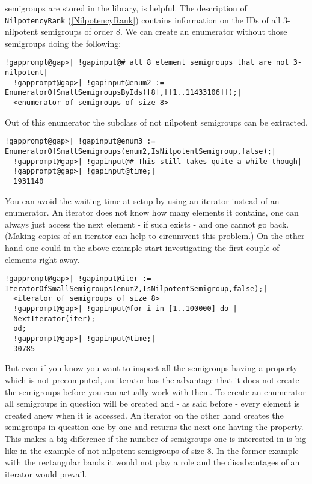 \documentclass[a4paper,11pt]{report}
\begin{document}
{{{semigroups are stored in the library, is helpful. The description of \texttt{NilpotencyRank} (\ref{NilpotencyRank}) contains information on the IDs of all 3-nilpotent semigroups of order 8. We
can create an enumerator without those semigroups doing the following: 
\begin{Verbatim}[commandchars=!@|,fontsize=\small,frame=single,label=Example]
  !gapprompt@gap>| !gapinput@# all 8 element semigroups that are not 3-nilpotent|
  !gapprompt@gap>| !gapinput@enum2 := EnumeratorOfSmallSemigroupsByIds([8],[[1..11433106]]);|
  <enumerator of semigroups of size 8>
\end{Verbatim}
 Out of this enumerator the subclass of not nilpotent semigroups can be
extracted. 
\begin{Verbatim}[commandchars=!@|,fontsize=\small,frame=single,label=Example]
  !gapprompt@gap>| !gapinput@enum3 := EnumeratorOfSmallSemigroups(enum2,IsNilpotentSemigroup,false);|
  !gapprompt@gap>| !gapinput@# This still takes quite a while though|
  !gapprompt@gap>| !gapinput@time;|
  1931140
\end{Verbatim}
 You can avoid the waiting time at setup by using an iterator instead of an
enumerator. An iterator does not know how many elements it contains, one can
always just access the next element - if such exists - and one cannot go back.
(Making copies of an iterator can help to circumvent this problem.) On the
other hand one could in the above example start investigating the first couple
of elements right away. 
\begin{Verbatim}[commandchars=!@|,fontsize=\small,frame=single,label=Example]
  !gapprompt@gap>| !gapinput@iter := IteratorOfSmallSemigroups(enum2,IsNilpotentSemigroup,false);|
  <iterator of semigroups of size 8>
  !gapprompt@gap>| !gapinput@for i in [1..100000] do |
  NextIterator(iter);
  od;
  !gapprompt@gap>| !gapinput@time;|
  30785
\end{Verbatim}
 But even if you know you want to inspect all the semigroups having a property
which is not precomputed, an iterator has the advantage that it does not
create the semigroups before you can actually work with them. To create an
enumerator all semigroups in question will be created and - as said before -
every element is created anew when it is accessed. An iterator on the other
hand creates the semigroups in question one-by-one and returns the next one
having the property. This makes a big difference if the number of semigroups
one is interested in is big like in the example of not nilpotent semigroups of
size 8. In the former example with the rectangular bands it would not play a
role and the disadvantages of an iterator would prevail. 

}}}
\end{document}
